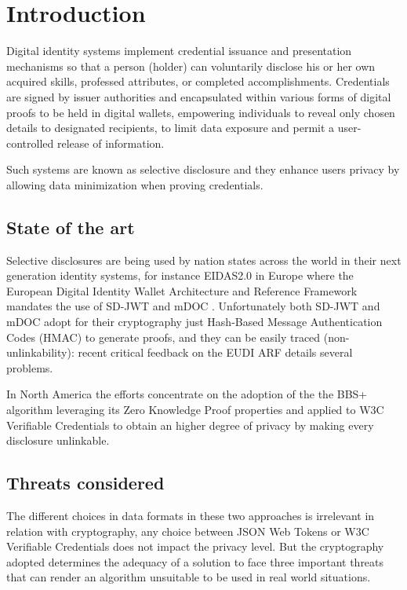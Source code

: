 \section{Introduction}
Digital identity systems implement credential issuance and presentation mechanisms so that a person (holder) can voluntarily disclose his or her own acquired skills, professed attributes, or completed accomplishments. Credentials are signed by issuer authorities and encapsulated within various forms of digital proofs to be held in digital wallets, empowering individuals to reveal only chosen details to designated recipients, to limit data exposure and permit a user-controlled release of information.

Such systems are known as selective disclosure and they enhance users privacy by allowing data minimization when proving credentials.
\subsection{State of the art}

Selective disclosures are being used by nation states across the world in their next generation identity systems, for instance EIDAS2.0 in Europe where the European Digital Identity Wallet Architecture and Reference Framework\cite{eudi-arf} mandates the use of SD-JWT\cite{sd-jwt} and mDOC \cite{mdoc}. Unfortunately both SD-JWT and mDOC adopt for their cryptography just Hash-Based Message Authentication Codes (HMAC) to generate proofs, and they can be easily traced (non-unlinkability): recent critical feedback on the EUDI ARF\cite{troncoso} details several problems.


In North America the efforts concentrate on the adoption of the the BBS+ algorithm\cite{bbs+} leveraging its Zero Knowledge Proof properties and applied to W3C Verifiable Credentials\cite{w3c-vc} to obtain an higher degree of privacy by making every disclosure unlinkable.
\subsection{Threats considered}

The different choices in data formats in these two approaches is irrelevant in relation with cryptography, any choice between JSON Web Tokens or W3C Verifiable Credentials does not impact the privacy level. But the cryptography adopted determines the adequacy of a solution to face three important threats that can render an algorithm unsuitable to be used in real world situations.

